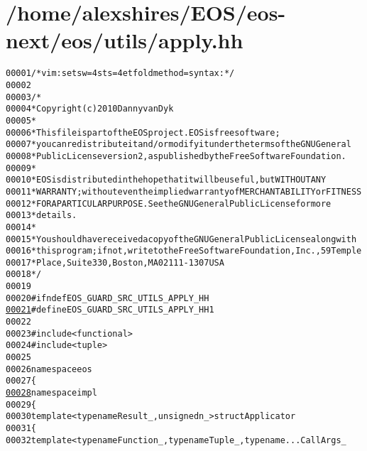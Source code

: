 \hypertarget{apply_8hh_source}{
\section{/home/alexshires/EOS/eos-\/next/eos/utils/apply.hh}
}


\begin{footnotesize}\begin{alltt}
00001 \textcolor{comment}{/* vim: set sw=4 sts=4 et foldmethod=syntax : */}
00002 
00003 \textcolor{comment}{/*}
00004 \textcolor{comment}{ * Copyright (c) 2010 Danny van Dyk}
00005 \textcolor{comment}{ *}
00006 \textcolor{comment}{ * This file is part of the EOS project. EOS is free software;}
00007 \textcolor{comment}{ * you can redistribute it and/or modify it under the terms of the GNU General}
00008 \textcolor{comment}{ * Public License version 2, as published by the Free Software Foundation.}
00009 \textcolor{comment}{ *}
00010 \textcolor{comment}{ * EOS is distributed in the hope that it will be useful, but WITHOUT ANY}
00011 \textcolor{comment}{ * WARRANTY; without even the implied warranty of MERCHANTABILITY or FITNESS}
00012 \textcolor{comment}{ * FOR A PARTICULAR PURPOSE.  See the GNU General Public License for more}
00013 \textcolor{comment}{ * details.}
00014 \textcolor{comment}{ *}
00015 \textcolor{comment}{ * You should have received a copy of the GNU General Public License along with}
00016 \textcolor{comment}{ * this program; if not, write to the Free Software Foundation, Inc., 59 Temple}
00017 \textcolor{comment}{ * Place, Suite 330, Boston, MA  02111-1307  USA}
00018 \textcolor{comment}{ */}
00019 
00020 \textcolor{preprocessor}{#ifndef EOS\_GUARD\_SRC\_UTILS\_APPLY\_HH}
\hypertarget{apply_8hh_source_l00021}{}\hyperlink{apply_8hh_a4328bcf6a6b86a72d4e546c8e99a0b5f}{00021} \textcolor{preprocessor}{}\textcolor{preprocessor}{#define EOS\_GUARD\_SRC\_UTILS\_APPLY\_HH 1}
00022 \textcolor{preprocessor}{}
00023 \textcolor{preprocessor}{#include <functional>}
00024 \textcolor{preprocessor}{#include <tuple>}
00025 
00026 \textcolor{keyword}{namespace }eos
00027 \{
\hypertarget{apply_8hh_source_l00028}{}\hyperlink{namespaceeos_1_1impl}{00028}     \textcolor{keyword}{namespace }impl
00029     \{
00030         \textcolor{keyword}{template} <\textcolor{keyword}{typename} Result\_, \textcolor{keywordtype}{unsigned} n\_> \textcolor{keyword}{struct }Applicator
00031         \{
00032             \textcolor{keyword}{template} <\textcolor{keyword}{typename} Function\_, \textcolor{keyword}{typename} Tuple\_, \textcolor{keyword}{typename} ... CallArgs\_

\end{alltt}
\end{footnotesize}
